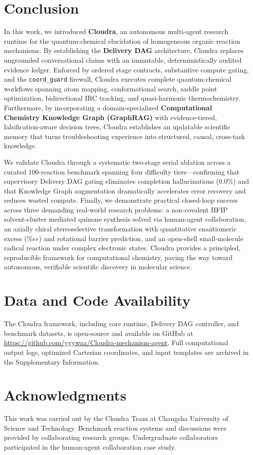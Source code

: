 \documentclass[10pt,twocolumn,letterpaper]{article}
\begin{document}
\section{Conclusion}
In this work, we introduced \textbf{Cloudra}, an autonomous multi-agent research runtime for the quantum-chemical elucidation of homogeneous organic reaction mechanisms. By establishing the \textbf{Delivery DAG} architecture, Cloudra replaces ungrounded conversational claims with an immutable, deterministically audited evidence ledger. Enforced by ordered stage contracts, substantive compute gating, and the \texttt{coord\_guard} firewall, Cloudra executes complete quantum-chemical workflows spanning atom mapping, conformational search, saddle point optimization, bidirectional IRC tracking, and quasi-harmonic thermochemistry. Furthermore, by incorporating a domain-specialized \textbf{Computational Chemistry Knowledge Graph (GraphRAG)} with evidence-tiered, falsification-aware decision trees, Cloudra establishes an updatable scientific memory that turns troubleshooting experience into structured, causal, cross-task knowledge.

We validate Cloudra through a systematic two-stage serial ablation across a curated 100-reaction benchmark spanning four difficulty tiers---confirming that supervisory Delivery DAG gating eliminates completion hallucinations ($0.0\%$) and that Knowledge Graph augmentation dramatically accelerates error recovery and reduces wasted compute. Finally, we demonstrate practical closed-loop success across three demanding real-world research problems: a non-covalent HFIP solvent-cluster mediated quinone synthesis solved via human-agent collaboration, an axially chiral stereoselective transformation with quantitative enantiomeric excess ($\%ee$) and rotational barrier prediction, and an open-shell small-molecule radical reaction under complex electronic states. Cloudra provides a principled, reproducible framework for computational chemistry, paving the way toward autonomous, verifiable scientific discovery in molecular science.

\section*{Data and Code Availability}
The Cloudra framework, including core runtime, Delivery DAG controller, and benchmark datasets, is open-source and available on GitHub at \url{https://github.com/yyywaa/Cloudra-mechanism-agent}. Full computational output logs, optimized Cartesian coordinates, and input templates are archived in the Supplementary Information.

\section*{Acknowledgments}
This work was carried out by the Cloudra Team at Changsha University of Science and Technology. Benchmark reaction systems and discussions were provided by collaborating research groups. Undergraduate collaborators participated in the human-agent collaboration case study.



\end{document}
